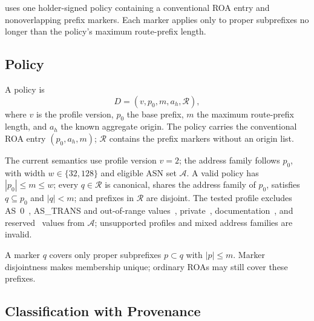 \label{sec:design}

\ssrov{} uses one holder-signed policy containing a conventional ROA entry and nonoverlapping prefix markers. Each marker applies only to proper subprefixes no longer than the policy's maximum route-prefix length.

\subsection{\ssrov{} Policy}

A policy is
\begin{equation}
D=(v,p_0,m,a_h,\mathcal{R}),
\end{equation}
where $v$ is the profile version, $p_0$ the base prefix, $m$ the maximum route-prefix length, and $a_h$ the known aggregate origin. The policy carries the conventional ROA entry $(p_0,a_h,m)$; $\mathcal{R}$ contains the prefix markers without an origin list.

The current semantics use profile version $v=2$; the address family follows $p_0$, with width $w\in\{32,128\}$ and eligible ASN set $\mathcal{A}$. A valid policy has $|p_0|\leq m\leq w$; every $q\in\mathcal{R}$ is canonical, shares the address family of $p_0$, satisfies $q\subseteq p_0$ and $|q|<m$; and prefixes in $\mathcal{R}$ are disjoint. The tested profile excludes AS~0~\cite{rfc7607}, AS\_TRANS and out-of-range values~\cite{rfc6793}, private~\cite{rfc6996}, documentation~\cite{rfc5398}, and reserved~\cite{iana-as-numbers} values from $\mathcal{A}$; unsupported profiles and mixed address families are invalid.

A marker $q$ covers only proper subprefixes $p\subset q$ with $|p|\leq m$. Marker disjointness makes membership unique; ordinary ROAs may still cover these prefixes.

\subsection{Classification with Provenance}

